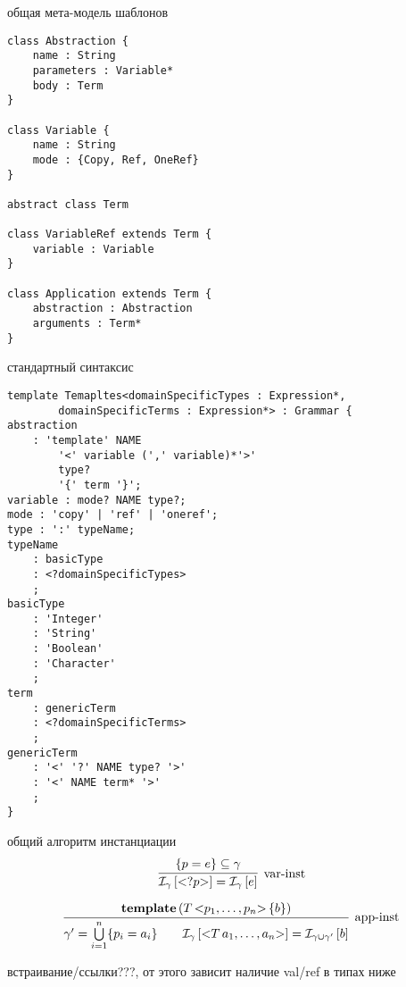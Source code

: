 общая мета-модель шаблонов

\begin{lstlisting}
class Abstraction {
	name : String
	parameters : Variable*
	body : Term
}

class Variable {
	name : String
	mode : {Copy, Ref, OneRef}
}

abstract class Term

class VariableRef extends Term {
	variable : Variable
}

class Application extends Term {
	abstraction : Abstraction
	arguments : Term*
}
\end{lstlisting}

стандартный синтаксис
\begin{lstlisting}
template Temapltes<domainSpecificTypes : Expression*, 
		domainSpecificTerms : Expression*> : Grammar {
abstraction 
	: 'template' NAME 
		'<' variable (',' variable)*'>' 
		type? 
		'{' term '}';
variable : mode? NAME type?;
mode : 'copy' | 'ref' | 'oneref';
type : ':' typeName;
typeName
	: basicType
	: <?domainSpecificTypes>
	;
basicType
	: 'Integer'
	: 'String'
	: 'Boolean'
	: 'Character'
	;
term
	: genericTerm
	: <?domainSpecificTerms>
	;
genericTerm
	: '<' '?' NAME type? '>'
	: '<' NAME term* '>'
	;
}
\end{lstlisting}

\newcommand{\ang}[1]{\mathsf{<}#1\mathsf{>}}
общий алгоритм инстанциации
$$
\trule{
	\{p = e\} \subseteq \gamma
}{
	\Inst{\gamma}{\ang{?p}} = \Inst{\gamma}{e}
}{var-inst}
$$ 

$$
\trule{
	\mathbf{template}\left(
		T \, \ang{p_1, \ldots, p_n} \, \{ b \}
	\right)
}{
	\gamma' = \bigcup\limits_{i=1}^{n} \{ p_i = a_i \}
	\qquad
	\Inst{\gamma}{\ang{T \, a_1, \ldots, a_n}} = \Inst{\gamma \cup \gamma'}{b}
}{app-inst}
$$

встраивание/ссылки???, от этого зависит наличие val/ref в типах ниже

